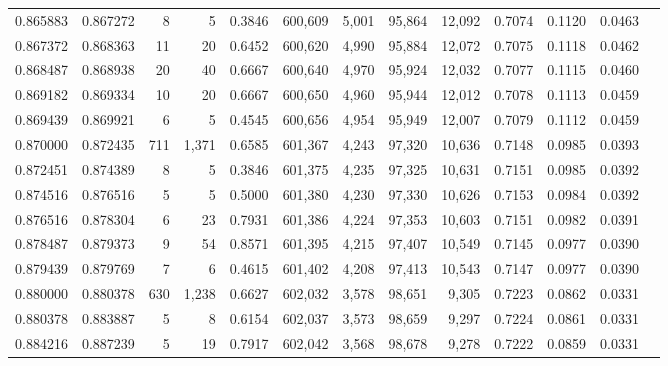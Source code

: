 \begin{tabular}{rrrrrrrrrrrrr}
0.865883 & 0.867272 &      8 &     5 &                                     0.3846 & 600,609 &   5,001 &  95,864 &  12,092 & 0.7074 & 0.1120 & 0.0463 \\
0.867372 & 0.868363 &     11 &    20 &                                     0.6452 & 600,620 &   4,990 &  95,884 &  12,072 & 0.7075 & 0.1118 & 0.0462 \\
0.868487 & 0.868938 &     20 &    40 &                                     0.6667 & 600,640 &   4,970 &  95,924 &  12,032 & 0.7077 & 0.1115 & 0.0460 \\
0.869182 & 0.869334 &     10 &    20 &                                     0.6667 & 600,650 &   4,960 &  95,944 &  12,012 & 0.7078 & 0.1113 & 0.0459 \\
0.869439 & 0.869921 &      6 &     5 &                                     0.4545 & 600,656 &   4,954 &  95,949 &  12,007 & 0.7079 & 0.1112 & 0.0459 \\
0.870000 & 0.872435 &    711 & 1,371 &                                     0.6585 & 601,367 &   4,243 &  97,320 &  10,636 & 0.7148 & 0.0985 & 0.0393 \\
0.872451 & 0.874389 &      8 &     5 &                                     0.3846 & 601,375 &   4,235 &  97,325 &  10,631 & 0.7151 & 0.0985 & 0.0392 \\
0.874516 & 0.876516 &      5 &     5 &                                     0.5000 & 601,380 &   4,230 &  97,330 &  10,626 & 0.7153 & 0.0984 & 0.0392 \\
0.876516 & 0.878304 &      6 &    23 &                                     0.7931 & 601,386 &   4,224 &  97,353 &  10,603 & 0.7151 & 0.0982 & 0.0391 \\
0.878487 & 0.879373 &      9 &    54 &                                     0.8571 & 601,395 &   4,215 &  97,407 &  10,549 & 0.7145 & 0.0977 & 0.0390 \\
0.879439 & 0.879769 &      7 &     6 &                                     0.4615 & 601,402 &   4,208 &  97,413 &  10,543 & 0.7147 & 0.0977 & 0.0390 \\
0.880000 & 0.880378 &    630 & 1,238 &                                     0.6627 & 602,032 &   3,578 &  98,651 &   9,305 & 0.7223 & 0.0862 & 0.0331 \\
0.880378 & 0.883887 &      5 &     8 &                                     0.6154 & 602,037 &   3,573 &  98,659 &   9,297 & 0.7224 & 0.0861 & 0.0331 \\
0.884216 & 0.887239 &      5 &    19 &                                     0.7917 & 602,042 &   3,568 &  98,678 &   9,278 & 0.7222 & 0.0859 & 0.0331 \\

\end{tabular}
